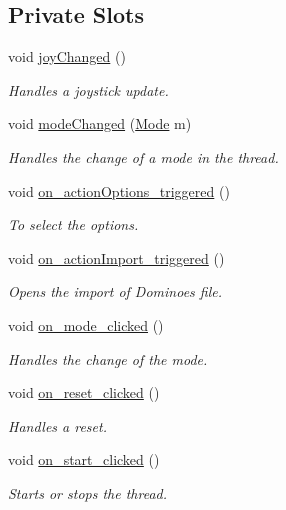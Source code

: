 \subsection*{Private Slots}
\begin{DoxyCompactItemize}
\item 
void \hyperlink{a00005_abb4c2d8a79c9f80010ea031366bf8226}{joy\+Changed} ()
\begin{DoxyCompactList}\small\item\em Handles a joystick update. \end{DoxyCompactList}\item 
void \hyperlink{a00005_ac5254b38dd1e34b14e2539905c64e2d8}{mode\+Changed} (\hyperlink{a00009_a8d581034e60792a9995d44065f6140a5}{Mode} m)
\begin{DoxyCompactList}\small\item\em Handles the change of a mode in the thread. \end{DoxyCompactList}\item 
void \hyperlink{a00005_a1dd57ccb62bc6f5a361aba6e088dd2e1}{on\+\_\+action\+Options\+\_\+triggered} ()
\begin{DoxyCompactList}\small\item\em To select the options. \end{DoxyCompactList}\item 
void \hyperlink{a00005_a73be2df93057d846aa541dffb00e7144}{on\+\_\+action\+Import\+\_\+triggered} ()
\begin{DoxyCompactList}\small\item\em Opens the import of Dominoes file. \end{DoxyCompactList}\item 
void \hyperlink{a00005_a26cc0e0a380ffbd33264c333d3ba1859}{on\+\_\+mode\+\_\+clicked} ()
\begin{DoxyCompactList}\small\item\em Handles the change of the mode. \end{DoxyCompactList}\item 
void \hyperlink{a00005_a0df9b8dd6a148bcf9d09c72227ec26ef}{on\+\_\+reset\+\_\+clicked} ()
\begin{DoxyCompactList}\small\item\em Handles a reset. \end{DoxyCompactList}\item 
void \hyperlink{a00005_ae66e9ab15f911b93fce0f161d2fde880}{on\+\_\+start\+\_\+clicked} ()
\begin{DoxyCompactList}\small\item\em Starts or stops the thread. \end{DoxyCompactList}\item 

\end{DoxyCompactItemize}
